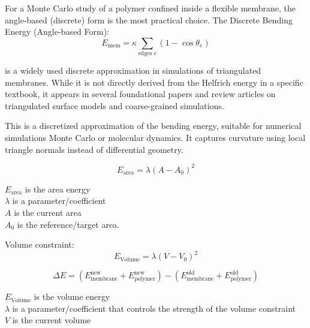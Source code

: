 \documentclass[12pt]{article}
\begin{document}
\begin{flushleft}
For a Monte Carlo study of a polymer confined inside a flexible membrane, the angle‐based (discrete) form is the most practical choice. The Discrete Bending Energy (Angle-based Form):
\begin{equation}
E_{\text{mem}} = \kappa \sum_{\text{edges } e} \left(1 - \cos \theta_e \right)
\end{equation}


\noindent is a widely used discrete approximation in simulations of triangulated membranes. While it is not directly derived from the Helfrich energy in a specific textbook, it appears in several foundational papers and review articles on triangulated surface models and coarse-grained simulations\cite{gompper1997triangulated}.





This is a discretized approximation of the bending energy, suitable for numerical simulations Monte Carlo or molecular dynamics. It captures curvature using local triangle normals instead of differential geometry.


\begin{equation}
E_{\text{area}} = \lambda(A - A_0)^2
\end{equation}

$E_{\text{area}}$ is the area energy\\
$\lambda$ is a parameter/coefficient\\
$A$ is the current area\\
$A_0$ is the reference/target area.



Volume constraint:
\begin{equation}
E_{\text{Volume}} = \lambda(V - V_0)^2
\end{equation}



\begin{equation}
\Delta E = (E_{\text{membrane}}^{\text{new}} + E_{\text{polymer}}^{\text{new}}) - (E_{\text{membrane}}^{\text{old}} + E_{\text{polymer}}^{\text{old}})
\end{equation}

$E_{\text{Volume}}$ is the volume energy\\

$\lambda$ is a parameter/coefficient that controls the strength of the volume constraint\\

$V$ is the current volume\\


\end{flushleft}
\end{document}
